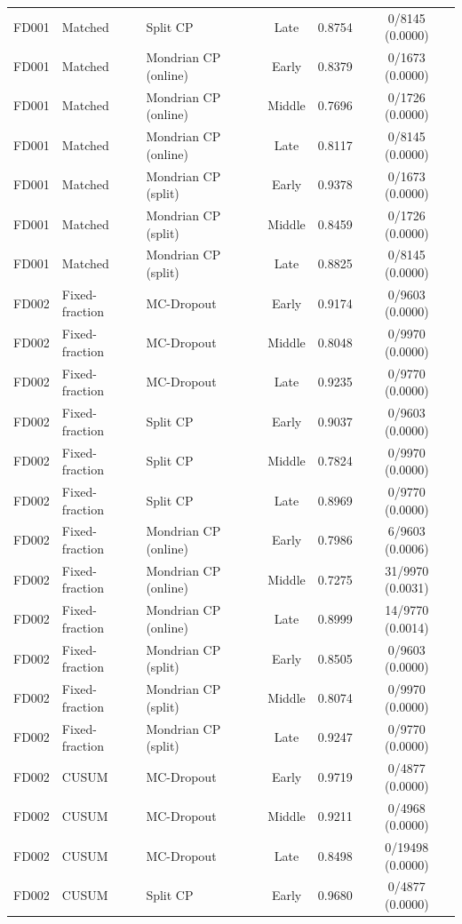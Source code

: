 \begin{table}[t]
\begin{tabular}{lllccc}
FD001 & Matched & Split CP & Late & 0.8754 & 0/8145 (0.0000) \\
FD001 & Matched & Mondrian CP (online) & Early & 0.8379 & 0/1673 (0.0000) \\
FD001 & Matched & Mondrian CP (online) & Middle & 0.7696 & 0/1726 (0.0000) \\
FD001 & Matched & Mondrian CP (online) & Late & 0.8117 & 0/8145 (0.0000) \\
FD001 & Matched & Mondrian CP (split) & Early & 0.9378 & 0/1673 (0.0000) \\
FD001 & Matched & Mondrian CP (split) & Middle & 0.8459 & 0/1726 (0.0000) \\
FD001 & Matched & Mondrian CP (split) & Late & 0.8825 & 0/8145 (0.0000) \\
FD002 & Fixed-fraction & MC-Dropout & Early & 0.9174 & 0/9603 (0.0000) \\
FD002 & Fixed-fraction & MC-Dropout & Middle & 0.8048 & 0/9970 (0.0000) \\
FD002 & Fixed-fraction & MC-Dropout & Late & 0.9235 & 0/9770 (0.0000) \\
FD002 & Fixed-fraction & Split CP & Early & 0.9037 & 0/9603 (0.0000) \\
FD002 & Fixed-fraction & Split CP & Middle & 0.7824 & 0/9970 (0.0000) \\
FD002 & Fixed-fraction & Split CP & Late & 0.8969 & 0/9770 (0.0000) \\
FD002 & Fixed-fraction & Mondrian CP (online) & Early & 0.7986 & 6/9603 (0.0006) \\
FD002 & Fixed-fraction & Mondrian CP (online) & Middle & 0.7275 & 31/9970 (0.0031) \\
FD002 & Fixed-fraction & Mondrian CP (online) & Late & 0.8999 & 14/9770 (0.0014) \\
FD002 & Fixed-fraction & Mondrian CP (split) & Early & 0.8505 & 0/9603 (0.0000) \\
FD002 & Fixed-fraction & Mondrian CP (split) & Middle & 0.8074 & 0/9970 (0.0000) \\
FD002 & Fixed-fraction & Mondrian CP (split) & Late & 0.9247 & 0/9770 (0.0000) \\
FD002 & CUSUM & MC-Dropout & Early & 0.9719 & 0/4877 (0.0000) \\
FD002 & CUSUM & MC-Dropout & Middle & 0.9211 & 0/4968 (0.0000) \\
FD002 & CUSUM & MC-Dropout & Late & 0.8498 & 0/19498 (0.0000) \\
FD002 & CUSUM & Split CP & Early & 0.9680 & 0/4877 (0.0000) \\

\end{tabular}
\end{table}
